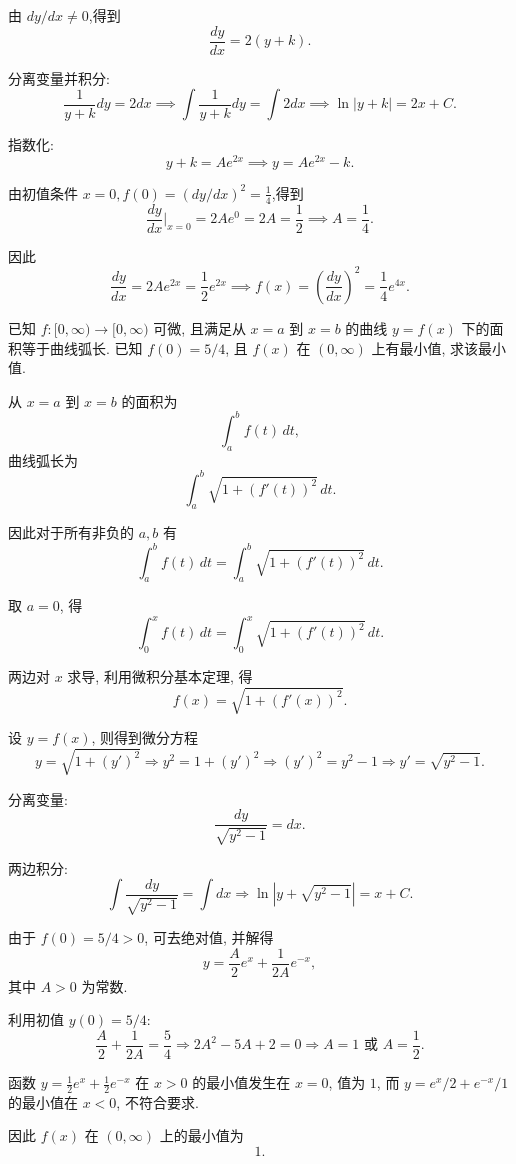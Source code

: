 \begin{questions}
\begin{solution}
由 $dy/dx \neq 0$,得到
\[
\frac{dy}{dx} = 2(y+k).
\]

分离变量并积分:
\[
\frac{1}{y+k} dy = 2 dx \implies \int \frac{1}{y+k} dy = \int 2 dx \implies \ln|y+k| = 2x + C.
\]

指数化:
\[
y+k = Ae^{2x} \implies y = Ae^{2x} - k.
\]

由初值条件 $x=0,f(0) = (dy/dx)^2 = \frac{1}{4}$,得到
\[
\frac{dy}{dx}\Big|_{x=0} = 2A e^{0} = 2A = \frac{1}{2} \implies A = \frac{1}{4}.
\]

因此
\[
\frac{dy}{dx} = 2A e^{2x} = \frac{1}{2} e^{2x} \implies f(x) = \left(\frac{dy}{dx}\right)^2 = \frac{1}{4} e^{4x}.
\]

\end{solution}

    \question 已知 $f: [0, \infty) \to [0, \infty)$ 可微, 且满足从 $x=a$ 到 $x=b$ 的曲线 $y=f(x)$ 下的面积等于曲线弧长. 已知 $f(0) = 5/4$, 且 $f(x)$ 在 $(0, \infty)$ 上有最小值, 求该最小值.

\begin{solution}
从 $x=a$ 到 $x=b$ 的面积为
\[
\int_{a}^{b} f(t) \,dt,
\]
曲线弧长为
\[
\int_{a}^{b} \sqrt{1 + (f'(t))^2} \,dt.
\]

因此对于所有非负的 $a,b$ 有
\[
\int_{a}^{b} f(t) \,dt = \int_{a}^{b} \sqrt{1 + (f'(t))^2} \,dt.
\]

取 $a=0$, 得
\[
\int_{0}^{x} f(t) \,dt = \int_{0}^{x} \sqrt{1 + (f'(t))^2} \,dt.
\]

两边对 $x$ 求导, 利用微积分基本定理, 得
\[
f(x) = \sqrt{1 + (f'(x))^2}.
\]

设 $y = f(x)$, 则得到微分方程
\[
y = \sqrt{1 + (y')^2} \Rightarrow y^2 = 1 + (y')^2 \Rightarrow (y')^2 = y^2 - 1 \Rightarrow y' = \sqrt{y^2 - 1}.
\]

分离变量:
\[
\frac{dy}{\sqrt{y^2-1}} = dx.
\]

两边积分:
\[
\int \frac{dy}{\sqrt{y^2-1}} = \int dx \Rightarrow \ln|y + \sqrt{y^2-1}| = x + C.
\]

由于 $f(0)=5/4>0$, 可去绝对值, 并解得
\[
y = \frac{A}{2} e^x + \frac{1}{2A} e^{-x},
\]
其中 $A>0$ 为常数.

利用初值 $y(0)=5/4$:
\[
\frac{A}{2} + \frac{1}{2A} = \frac{5}{4} \Rightarrow 2A^2 - 5A + 2 = 0 \Rightarrow A = 1 \text{ 或 } A = \frac{1}{2}.
\]

函数 $y = \frac{1}{2} e^x + \frac{1}{2} e^{-x}$ 在 $x>0$ 的最小值发生在 $x = 0$, 值为 $1$, 而 $y = e^x/2 + e^{-x}/1$ 的最小值在 $x < 0$, 不符合要求. 

因此 $f(x)$ 在 $(0,\infty)$ 上的最小值为
\[
1.
\]
\end{solution}


\end{questions}
